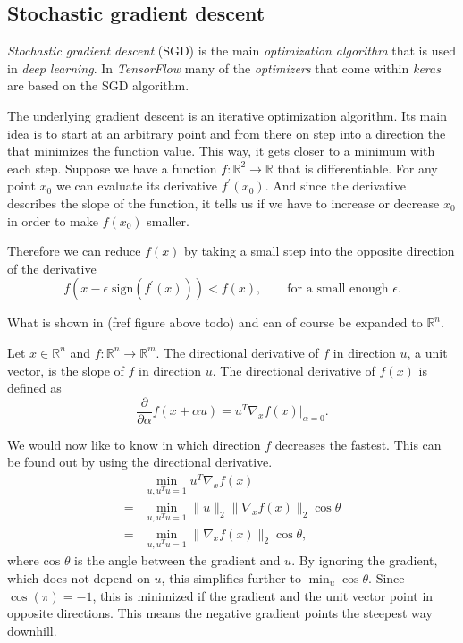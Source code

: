 \subsection{Stochastic gradient descent}
\emph{Stochastic gradient descent} (SGD) is the main \emph{optimization algorithm} that is used in \emph{deep learning}.
In \emph{TensorFlow} many of the \emph{optimizers} that come within \emph{keras} are based on the SGD algorithm.

The underlying gradient descent is an iterative optimization algorithm.
Its main idea is to start at an arbitrary point and from there on step into a direction the that minimizes the function value.
This way, it gets closer to a minimum with each step.
Suppose we have a function \(f : \mathbb{R}^2 \rightarrow \mathbb{R}\) that is differentiable.
For any point \(x_0\) we can evaluate its derivative \(f^{\prime}(x_0)\).
And since the derivative describes the slope of the function, it tells us if we have to increase or decrease \(x_0\) in order to make \(f(x_0)\) smaller.

Therefore we can reduce \(f(x)\) by taking a small step into the opposite direction of the derivative \cite{cauchy}
\begin{equation}
    \label{eq:cauchy}
    f(x - \epsilon \; \text{sign}(f^{\prime}(x))) < f(x), \qquad \text{for a small enough } \epsilon.
\end{equation}


What is shown in (fref figure above todo) and  can of course be expanded to \(\mathbb{R}^n\).

Let \(x \in \mathbb{R}^n\) and \(f : \mathbb{R}^n \rightarrow \mathbb{R}^m\).
The directional derivative of \(f\) in direction \(u\), a unit vector, is the slope of \(f\) in direction \(u\).
The directional derivative of \(f(x)\) is defined as 
\begin{equation}
    \frac{\partial}{\partial \alpha} f(x + \alpha u) = u^{T} \nabla_x f(x) \big\vert_{\alpha = 0}.
\end{equation}

We would now like to know in which direction \(f\) decreases the fastest.
This can be found out by using the directional derivative.
\begin{align}
      &\min_{u, u^{T}u = 1} u^{T} \nabla_x f(x) \\
    = &\min_{u, u^{T}u = 1} \lVert u \rVert_2 \lVert \nabla_x f(x) \rVert_2 \cos \theta \\
    = &\min_{u, u^{T}u = 1} \lVert \nabla_x f(x) \rVert_2 \cos \theta,
\end{align}
where \(\text{cos } \theta\) is the angle between the gradient and \(u\).
By ignoring the gradient, which does not depend on \(u\), this simplifies further to \(\min_{u} \cos \theta\).
Since \(\cos(\pi) = -1\), this is minimized if the gradient and the unit vector point in opposite directions.
This means the negative gradient points the steepest way downhill.

